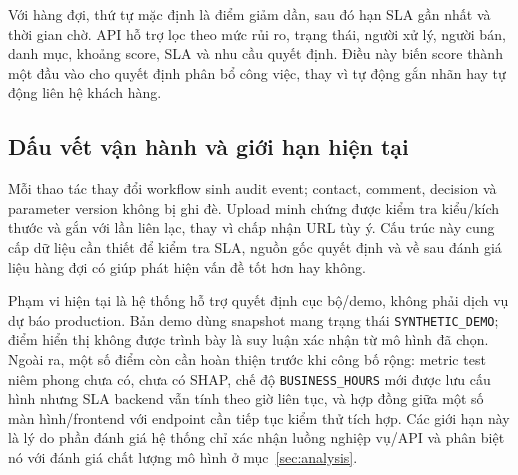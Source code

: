Với hàng đợi, thứ tự mặc định là điểm giảm dần, sau đó hạn SLA gần nhất và thời gian chờ. API hỗ trợ lọc theo mức rủi ro, trạng thái, người xử lý, người bán, danh mục, khoảng score, SLA và nhu cầu quyết định. Điều này biến score thành một đầu vào cho quyết định phân bổ công việc, thay vì tự động gắn nhãn hay tự động liên hệ khách hàng.

\subsection{Dấu vết vận hành và giới hạn hiện tại}

Mỗi thao tác thay đổi workflow sinh audit event; contact, comment, decision và parameter version không bị ghi đè. Upload minh chứng được kiểm tra kiểu/kích thước và gắn với lần liên lạc, thay vì chấp nhận URL tùy ý. Cấu trúc này cung cấp dữ liệu cần thiết để kiểm tra SLA, nguồn gốc quyết định và về sau đánh giá liệu hàng đợi có giúp phát hiện vấn đề tốt hơn hay không.

Phạm vi hiện tại là hệ thống hỗ trợ quyết định cục bộ/demo, không phải dịch vụ dự báo production. Bản demo dùng snapshot mang trạng thái \texttt{SYNTHETIC\_DEMO}; điểm hiển thị không được trình bày là suy luận xác nhận từ mô hình đã chọn. Ngoài ra, một số điểm còn cần hoàn thiện trước khi công bố rộng: metric test niêm phong chưa có, chưa có SHAP, chế độ \texttt{BUSINESS\_HOURS} mới được lưu cấu hình nhưng SLA backend vẫn tính theo giờ liên tục, và hợp đồng giữa một số màn hình/frontend với endpoint cần tiếp tục kiểm thử tích hợp. Các giới hạn này là lý do phần đánh giá hệ thống chỉ xác nhận luồng nghiệp vụ/API và phân biệt nó với đánh giá chất lượng mô hình ở mục~\ref{sec:analysis}.
